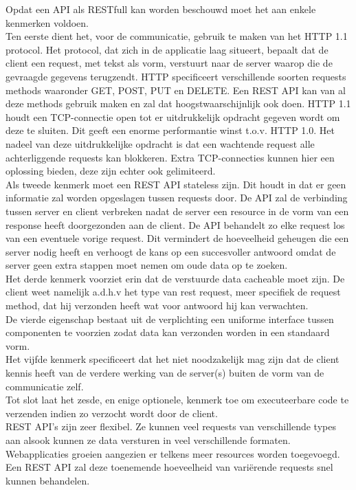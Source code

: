 Opdat een API als RESTfull kan worden beschouwd moet het aan enkele kenmerken voldoen.\\
Ten eerste dient het, voor de communicatie, gebruik te maken van het HTTP 1.1 protocol. Het protocol, dat zich in de applicatie laag situeert,
bepaalt dat de client een request, met tekst als vorm, verstuurt naar de server waarop die de gevraagde gegevens terugzendt.
HTTP specificeert verschillende soorten requests methods waaronder GET, POST, PUT en DELETE. Een REST API kan van al deze methods gebruik maken en zal dat
hoogstwaarschijnlijk ook doen. HTTP 1.1 houdt een TCP-connectie open tot er uitdrukkelijk opdracht gegeven wordt om deze te sluiten.
Dit geeft een enorme performantie winst t.o.v. HTTP 1.0. Het nadeel van deze uitdrukkelijke opdracht is dat een wachtende request alle achterliggende requests kan blokkeren.
Extra TCP-connecties kunnen hier een oplossing bieden, deze zijn echter ook gelimiteerd.
~\autocite{w3Protocol}\\
Als tweede kenmerk moet een REST API stateless zijn. Dit houdt in dat er geen informatie zal worden opgeslagen tussen requests door.
De API zal de verbinding tussen server en client verbreken nadat de server een resource in de vorm van een response heeft doorgezonden aan de client.
De API behandelt zo elke request los van een eventuele vorige request. Dit vermindert de hoeveelheid geheugen die een server nodig heeft en verhoogt de
kans op een succesvoller antwoord omdat de server geen extra stappen moet nemen om oude data op te zoeken.\\
Het derde kenmerk voorziet erin dat de verstuurde data cacheable moet zijn. De client weet namelijk a.d.h.v het type van rest request,
meer specifiek de request method, dat hij verzonden heeft wat voor antwoord hij kan verwachten.\\
De vierde eigenschap bestaat uit de verplichting een uniforme interface tussen componenten te voorzien zodat data kan verzonden worden in een standaard vorm.\\
Het vijfde kenmerk specificeert dat het niet noodzakelijk mag zijn dat de client kennis heeft van de verdere werking van de server(s) buiten de vorm van de communicatie zelf.\\
Tot slot laat het zesde, en enige optionele, kenmerk toe om executeerbare code te verzenden indien zo verzocht wordt door de client.
~\autocite{redhat}\\

REST API's zijn zeer flexibel. Ze kunnen veel requests van verschillende types aan alsook kunnen ze data versturen in veel verschillende formaten.
Webapplicaties groeien aangezien er telkens meer resources worden toegevoegd. Een REST API zal deze toenemende hoeveelheid van variërende requests snel kunnen behandelen.\\

